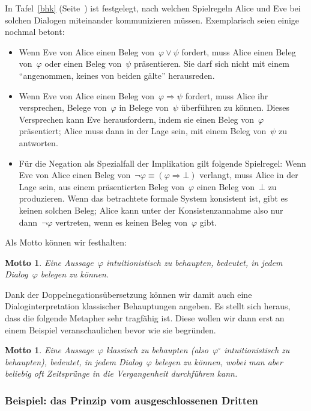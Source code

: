 \documentclass[a4paper,ngerman,12pt]{scrartcl}
\theoremstyle{definition}
\theoremstyle{plain}
\newtheorem{motto}[defn]{Motto}
\theoremstyle{remark}
\renewcommand{\_}{\mathpunct{.}\,}
\newcommand{\?}{\,{:}\,}
\begin{document}
In Tafel~\ref{bhk} (Seite~\pageref{bhk}) ist festgelegt, nach welchen
Spielregeln Alice und Eve bei solchen Dialogen miteinander kommunizieren
müssen. Exemplarisch seien einige nochmal betont:
\begin{itemize}
\item Wenn Eve von Alice einen Beleg von~$\varphi \vee \psi$ fordert,
muss Alice einen Beleg von~$\varphi$ oder einen Beleg von~$\psi$ präsentieren.
Sie darf sich nicht mit einem "`angenommen, keines von beiden gälte"'
herausreden.
\item Wenn Eve von Alice einen Beleg von~$\varphi \Rightarrow \psi$
fordert, muss Alice ihr versprechen, Belege von~$\varphi$ in Belege von~$\psi$
überführen zu können. Dieses Versprechen kann Eve herausfordern, indem sie
einen Beleg von~$\varphi$ präsentiert; Alice muss dann in der Lage sein, mit
einem Beleg von~$\psi$ zu antworten.
\item Für die Negation als Spezialfall der Implikation gilt folgende Spielregel: Wenn Eve von
Alice einen Beleg von~$\neg\varphi \equiv (\varphi \Rightarrow \bot)$ verlangt,
muss Alice in der Lage sein, aus einem präsentierten Beleg von~$\varphi$ einen
Beleg von~$\bot$ zu produzieren. Wenn das betrachtete formale System konsistent
ist, gibt es keinen solchen Beleg; Alice kann unter der Konsistenzannahme also
nur dann~$\neg\varphi$ vertreten, wenn es keinen Beleg von~$\varphi$ gibt.
\end{itemize}

Als Motto können wir festhalten:

\begin{motto}
Eine Aussage~$\varphi$ intuitionistisch zu behaupten, bedeutet, in jedem
Dialog~$\varphi$ belegen zu können.
\end{motto}

Dank der Doppelnegationsübersetzung können wir damit auch eine
Dialoginterpretation klassischer Behauptungen angeben. Es stellt sich heraus,
dass die folgende Metapher sehr tragfähig ist. Diese wollen wir dann erst an
einem Beispiel veranschaulichen bevor wie sie begründen.

\begin{motto}
Eine Aussage~$\varphi$ klassisch zu behaupten (also~$\varphi^\circ$
intuitionistisch zu behaupten), bedeutet, in jedem Dialog~$\varphi$ belegen zu
können, wobei man aber beliebig oft Zeitsprünge in die Vergangenheit
durchführen kann.
\end{motto}


\subsubsection*{Beispiel: das Prinzip vom ausgeschlossenen Dritten}
\end{document}
